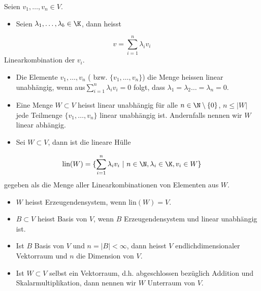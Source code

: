 \documentclass[letterpaper,10pt,english]{jupyterBook}
\begin{document}
\begin{definition}{}{}



Seien \(v_1,\ldots,v_n \in V\).
\begin{itemize}
\item {} 
Seien \(\lambda_1,\ldots,\lambda_b \in \K\), dann heisst

\end{itemize}
\begin{equation*}
 v = \sum_{i=1}^n \lambda_i v_i
\end{equation*}
Linearkombination der \(v_i\).
\begin{itemize}
\item {} 
Die Elemente \(v_1,\ldots,v_n\) ( bzw. \(\{v_1,\ldots,v_n\}\)) die Menge heissen linear unabhängig, wenn aus\(\sum_{i=1}^n \lambda_i v_i =0\) folgt, dass \(\lambda_1 = \lambda_2 \ldots = \lambda_n = 0\).

\item {} 
Eine Menge \(W \subset V\) heisst linear unabhängig für alle \(n \in \N \setminus \{0\}\), \(n \leq |W|\) jede Teilmenge \(\{v_1,\ldots,v_n\}\) linear unabhängig ist. Andernfalls nennen wir \(W\) linear abhängig.

\item {} 
Sei \(W \subset V\), dann ist die lineare Hülle

\end{itemize}
\begin{equation*}
 \text{lin}(W) = \{ \sum_{i=1}^n \lambda_i v_i~|~ n \in \N, \lambda_i \in \K, v_i \in W\}
\end{equation*}
gegeben als die Menge aller Linearkombinationen von Elementen aus \(W\).
\begin{itemize}
\item {} 
\(W\) heisst Erzeugendensystem, wenn lin\((W)=V\).

\item {} 
\(B \subset V\) heisst Basis von \(V\), wenn \(B\) Erzeugendensystem und linear unabhängig ist.

\item {} 
Ist \(B\) Basis von \(V\) und \(n=|B| < \infty\), dann heisst \(V\) endlichdimensionaler Vektorraum und \(n\) die Dimension von \(V\).

\item {} 
Ist \(W \subset V\) selbst ein Vektorraum, d.h. abgeschlossen bezüglich Addition und Skalarmultiplikation, dann nennen wir \(W\) Unterraum von \(V\).

\end{itemize}
\end{definition}
\end{document}
